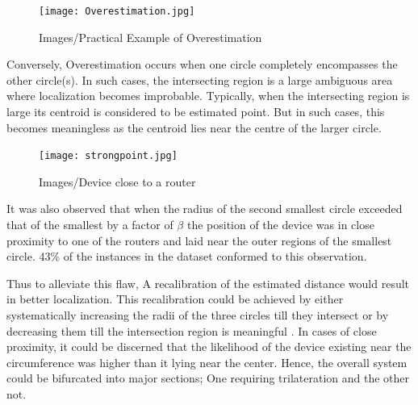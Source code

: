 \documentclass[twocolumn, 11pt]{IEEEtran}
\begin{document}
\begin{figure}[ht!]
\centering
\texttt{[image: Overestimation.jpg]}
\caption{ Images/Practical Example of Overestimation\label{overflow}}
\end{figure}

Conversely, Overestimation occurs when one circle completely encompasses the other circle(s). In such cases, the intersecting region is a large ambiguous area where localization becomes improbable. Typically, when the intersecting region is large its centroid is considered to be estimated point. But in such cases, this becomes meaningless as the centroid lies near the centre of the larger circle. %


\begin{figure}[ht!]
\centering
\texttt{[image: strongpoint.jpg]}
\caption{ Images/Device close to a router \label{overflow}}
\end{figure}


It was also observed that when the radius of the second smallest circle exceeded that of the smallest by a factor of \(\beta\) the position of the device was in close proximity to one of the routers and laid near the outer regions of the smallest circle. 43\% of the instances in the dataset conformed to this observation.  

 
Thus to alleviate this flaw, A recalibration of the estimated distance would result in better localization. This recalibration could be achieved by either systematically increasing the radii of the three circles till they intersect or by decreasing them till the intersection region is meaningful \cite{DCE}. In cases of close proximity, it could be discerned that the likelihood of the device existing near the circumference was higher than it lying near the center. Hence, the overall system could be bifurcated into major sections; One requiring trilateration and the other not.
\end{document}
